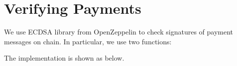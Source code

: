 \section{Verifying Payments}\label{sec:verifying-payments}
We use ECDSA library from OpenZeppelin to check signatures of payment messages on chain.
In particular, we use two functions:

The implementation is shown as below.
